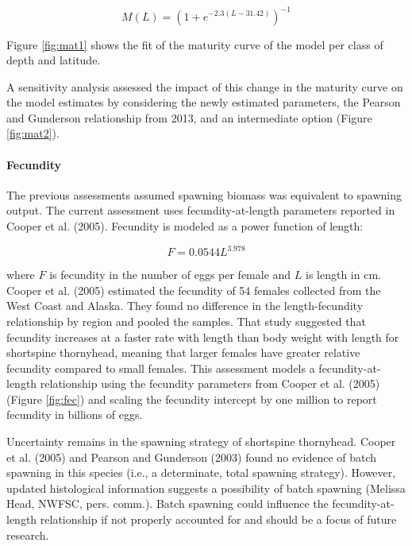 \documentclass[11pt,
  english,
  letterpaper,
]{article}
\begin{document}
\begin{equation} M(L) = (1+e^{-2.3(L-31.42)})^{-1}\end{equation}

Figure \ref{fig:mat1} shows the fit of the maturity curve of the model per class of depth and latitude.

A sensitivity analysis assessed the impact of this change in the maturity curve on the model estimates by considering the newly estimated parameters, the Pearson and Gunderson relationship from 2013, and an intermediate option (Figure \ref{fig:mat2}).

\hypertarget{fecundity}{%
\paragraph{Fecundity}\label{fecundity}}

The previous assessments assumed spawning biomass was equivalent to spawning output. The current assessment uses fecundity-at-length parameters reported in Cooper et al. (2005). Fecundity is modeled as a power function of length:

\begin{equation} F = 0.0544L^{3.978} \end{equation}

where \(F\) is fecundity in the number of eggs per female and \(L\) is length in cm. Cooper et al. (2005) estimated the fecundity of 54 females collected from the West Coast and Alaska. They found no difference in the length-fecundity relationship by region and pooled the samples. That study suggested that fecundity increases at a faster rate with length than body weight with length for shortspine thornyhead, meaning that larger females have greater relative fecundity compared to small females. This assessment models a fecundity-at-length relationship using the fecundity parameters from Cooper et al. (2005) (Figure \ref{fig:fec}) and scaling the fecundity intercept by one million to report fecundity in billions of eggs.

Uncertainty remains in the spawning strategy of shortspine thornyhead. Cooper et al. (2005) and Pearson and Gunderson (2003) found no evidence of batch spawning in this species (i.e., a determinate, total spawning strategy). However, updated histological information suggests a possibility of batch spawning (Melissa Head, NWFSC, pers. comm.). Batch spawning could influence the fecundity-at-length relationship if not properly accounted for and should be a focus of future research.
\end{document}
